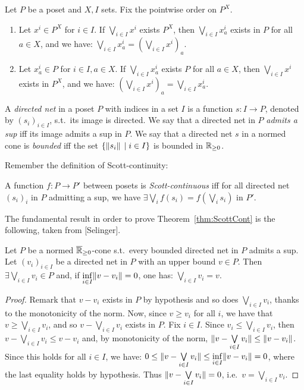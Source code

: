 \begin{lemma}\label{lm:sup=sup}
 Let $P$ be a poset and $X, I$ sets. Fix the pointwise order on $P^X$.
 \begin{enumerate}
  \item Let $x^i\in P^X$ for $i\in I$.
  If $\bigvee\limits_{i\in I} x^i$ exists $P^X$, then $\bigvee\limits_{i\in I} x^i_a$ exists in $P$ for all $a\in X$, and we have: $\bigvee\limits_{i\in I} x^i_a=\left(\bigvee\limits_{i\in I} x^i\right)_a$.
 \item Let $x^i_a\in P$ for $i\in I,a\in X$.
  If $\bigvee\limits_{i\in I} x^i_a$ exists $P$ for all $a\in X$, then $\bigvee\limits_{i\in I} x^i$ exists in $P^X$, and we have: $\left(\bigvee\limits_{i\in I} x^i\right)_a=\bigvee\limits_{i\in I} x^i_a$.
 \end{enumerate}
\end{lemma}

A \emph{directed net} in a poset $P$ with indices in a set $I$ is a function $s:I\to P$, denoted by $(s_i)_{i\in I}$, s.t.\ its image is directed.
We say that a directed net in $P$ \emph{admits a sup} iff its image admits a sup in $P$.
We say that a directed net $s$ in a normed cone is \emph{bounded} iff the set $\{\lVert s_i\rVert\,\mid i\in I\}$ is bounded in $\mathbb{R}_{\geq 0}$.

Remember the definition of Scott-continuity:

\begin{definition}
 A function $f:P\to P'$ between posets is \emph{Scott-continuous} iff for all directed net $(s_i)_i$ in $P$ admitting a sup, we have $\exists \bigvee\limits_i f(s_i) = f(\bigvee\limits_i s_i)$ in $P'$. 
\end{definition}

The fundamental result in order to prove Theorem~\ref{thm:ScottCont} is the following, taken from [Selinger].

\begin{proposition}\label{prop:infsup}
 Let $P$ be a normed $\overline{\mathbb{R}}_{\geq 0}$-cone s.t.\ every bounded directed net in $P$ admits a sup.
 Let $(v_i)_{i\in I}$ be a directed net in $P$ with an upper bound $v\in P$.
 Then $\exists\bigvee\limits_{i\in I} v_i \in P$ and, if $\inf\limits_{i\in I} \lVert v-v_i\rVert =0$, one has: $\bigvee\limits_{i\in I} v_i = v$.
\end{proposition}
\begin{proof}
 Remark that $v-v_i$ exists in $P$ by hypothesis and so does $\bigvee\limits_{i\in I} v_i$, thanks to the monotonicity of the norm.
 Now, since $v\geq v_i$ for all $i$, we have that $v\geq \bigvee\limits_{i\in I} v_i$, and so $v-\bigvee\limits_{i\in I} v_i$ exists in $P$.
 Fix $i\in I$.
 Since $v_i\leq \bigvee\limits_{i\in I} v_i$, then $v-\bigvee\limits_{i\in I} v_i\leq v-v_i$ and, by monotonicity of the norm, $\lVert v-\bigvee\limits_{i\in I} v_i\rVert\leq \lVert v-v_i\rVert$.
 Since this holds for all $i\in I$, we have:
 $0\leq \lVert v-\bigvee\limits_{i\in I} v_i\rVert\leq \inf\limits_{i\in I} \lVert v-v_i\rVert=0$, where the last equality holds by hypothesis.
 Thus $\lVert v-\bigvee\limits_{i\in I} v_i\rVert=0$, i.e.\ $v=\bigvee\limits_{i\in I} v_i$.
\end{proof}

